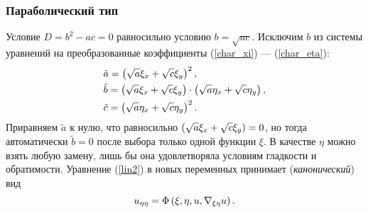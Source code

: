     \subsubsection{Параболический тип}
    Условие $D = b^2 - ac = 0$ равносильно условию $b = \sqrt{ac}$. Исключим $b$ из системы уравнений на преобразованные коэффициенты
    (\ref{char_xi}) --- (\ref{char_eta}):
    \begin{align}
        & \tilde{a} = \left({\sqrt{a}\xi_x + \sqrt{c}\xi_y}\right)^2,\\
        & \tilde{b} = \left({\sqrt{a}\xi_x + \sqrt{c}\xi_y }\right)\cdot\left({\sqrt{a}\eta_x + \sqrt{c}\eta_y}\right),\\
        & \tilde{c} = \left({\sqrt{a}\eta_x + \sqrt{c}\eta_y}\right)^2.
    \end{align}
    Приравняем $\tilde{a}$ к нулю, что равносильно $\left({\sqrt{a}\xi_x + \sqrt{c}\xi_y}\right) = 0$, но тогда автоматически $\tilde{b} = 0$
    после выбора только одной функции $\xi$. В качестве $\eta$ можно взять любую замену, лишь бы она удовлетворяла условиям гладкости и обратимости.
    Уравнение (\ref{lin2}) в новых переменных принимает (\textit{канонический}) вид
    \begin{equation}
        u_{\eta\eta} = \Phi\left({\xi, \eta, u, \nabla_{\xi\eta}u}\right). \label{par_canon}
    \end{equation}